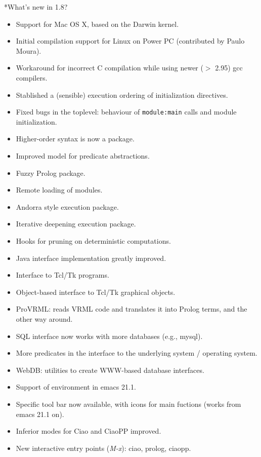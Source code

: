 \documentclass{article}
\makeatletter
\def\subsection{\@startsection{subsection}{2}{\z@}{-1.0ex plus -1ex minus 
 -.2ex}{0.7ex plus .2ex}{\normalsize\bf}}
\renewcommand{\baselinestretch}{0.95}
\newcommand{\myitems}{
\renewcommand{\baselinestretch}{0.5}
\parsep 0pt \parindent 0pt \itemsep -4pt \topsep -3pt }
\makeatother
\begin{document}
\subsection*{What's new in 1.8?}
\begin{itemize}
\myitems
\item Support for Mac OS X, based on the Darwin kernel.
\item Initial compilation support for Linux on Power PC
        (contributed by Paulo Moura).
\item Workaround for incorrect C compilation while using newer
         ($>$ 2.95) gcc compilers.
\item Stablished a (sensible) execution ordering of initialization
  directives.
\item Fixed bugs in the toplevel: behaviour of {\tt module:main} calls
  and module initialization.
\item Higher-order syntax is now a package.
\item Improved model for predicate abstractions.
\item Fuzzy Prolog package.
\item Remote loading of modules.
\item Andorra style execution package.
\item Iterative deepening execution package.
\item Hooks for pruning on deterministic computations.
\item Java interface implementation greatly improved.
\item Interface to Tcl/Tk programs.
\item Object-based interface to Tcl/Tk graphical objects.
\item ProVRML: reads VRML code and translates it into Prolog terms,
  and the other way around.
\item SQL interface now  works with more databases (e.g., mysql).
\item More predicates in the interface to the underlying system /
  operating system. 
\item WebDB: utilities to create WWW-based database interfaces.
\item Support of environment in emacs 21.1.
\item Specific tool bar now available, with icons for main fuctions 
  (works from emacs 21.1 on).
\item Inferior modes for Ciao and CiaoPP improved.
\item New interactive entry points ({\sl M-x}): ciao, prolog, ciaopp.

\end{itemize}
\end{document}
